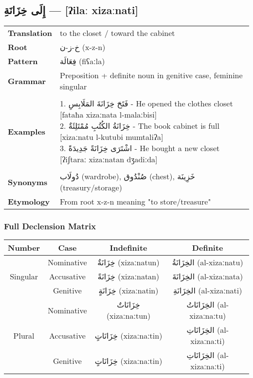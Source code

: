 \documentclass[letterpaper,12pt]{article}
\begin{document}
\subsection{\textarabic{إِلَى خِزَانَةِ} — [ʔilaː xizaːnati]}
\begin{tabular}{p{3cm}p{10cm}}
\toprule
\textbf{Translation} & to the closet / toward the cabinet \\
\textbf{Root} & \textarabic{خ-ز-ن} (x-z-n) \\
\textbf{Pattern} & \textarabic{فِعَالَة} (fiʕaːla) \\
\textbf{Grammar} & Preposition + definite noun in genitive case, feminine singular \\
\midrule \\
\textbf{Examples} & \makecell[l]{\parbox{9.5cm}{
1. \textarabic{فَتَحَ خِزَانَةَ المَلَابِسِ} - He opened the clothes closet [fataħa xizaːnata l-malaːbisi]\\
2. \textarabic{خِزَانَةُ الكُتُبِ مُمْتَلِئَةٌ} - The book cabinet is full [xizaːnatu l-kutubi mumtaliʔa]\\
3. \textarabic{اشْتَرَى خِزَانَةً جَدِيدَةً} - He bought a new closet [ʔiʃtaraː xizaːnatan dʒadiːda]
}} \\
\midrule \\
\textbf{Synonyms} & \textarabic{دُولَاب} (wardrobe), \textarabic{صُنْدُوق} (chest), \textarabic{خَزِينَة} (treasury/storage) \\
\textbf{Etymology} & From root x-z-n meaning "to store/treasure" \\
\bottomrule
\end{tabular}

\subsubsection*{Full Declension Matrix}
\begin{tabular}{|c|c|c|c|}
\hline
\textbf{Number} & \textbf{Case} & \textbf{Indefinite} & \textbf{Definite} \\
\hline
\multirow{3}{*}{Singular}
 & Nominative   & \textarabic{خِزَانَةٌ} (xizaːnatun) & \textarabic{الخِزَانَةُ} (al-xizaːnatu) \\
 & Accusative   & \textarabic{خِزَانَةً} (xizaːnatan) & \textarabic{الخِزَانَةَ} (al-xizaːnata) \\
 & Genitive     & \textarabic{خِزَانَةٍ} (xizaːnatin) & \textarabic{الخِزَانَةِ} (al-xizaːnati) \\
\hline
\multirow{3}{*}{Plural}
 & Nominative   & \textarabic{خِزَانَاتٌ} (xizaːnaːtun) & \textarabic{الخِزَانَاتُ} (al-xizaːnaːtu) \\
 & Accusative   & \textarabic{خِزَانَاتٍ} (xizaːnaːtin) & \textarabic{الخِزَانَاتِ} (al-xizaːnaːti) \\
 & Genitive     & \textarabic{خِزَانَاتٍ} (xizaːnaːtin) & \textarabic{الخِزَانَاتِ} (al-xizaːnaːti) \\
\hline
\end{tabular}
\end{document}
